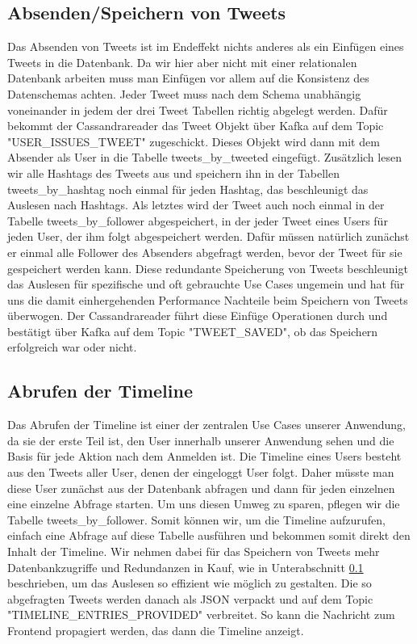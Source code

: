 \subsection{Absenden/Speichern von Tweets}
\label{subsec:Tweetabfrage}
Das Absenden von Tweets ist im Endeffekt nichts anderes als ein Einfügen eines Tweets in die Datenbank. Da wir hier aber nicht mit einer relationalen Datenbank arbeiten muss man Einfügen vor allem auf die Konsistenz des Datenschemas achten. Jeder Tweet muss nach dem Schema unabhängig voneinander in jedem der drei Tweet Tabellen richtig abgelegt werden. Dafür bekommt der Cassandrareader das Tweet Objekt über Kafka auf dem Topic "USER\_ISSUES\_TWEET" zugeschickt. Dieses Objekt wird dann mit dem Absender als User in die Tabelle tweets\_by\_tweeted eingefügt. Zusätzlich lesen wir alle Hashtags des Tweets aus und speichern ihn in der Tabellen tweets\_by\_hashtag noch einmal für jeden Hashtag, das beschleunigt das Auslesen nach Hashtags. Als letztes wird der Tweet auch noch einmal in der Tabelle tweets\_by\_follower abgespeichert, in der jeder Tweet eines Users für jeden User, der ihm folgt abgespeichert werden. Dafür müssen natürlich zunächst er einmal alle Follower des Absenders abgefragt werden, bevor der Tweet für sie gespeichert werden kann. Diese redundante Speicherung von Tweets beschleunigt das Auslesen für spezifische und oft gebrauchte Use Cases ungemein und hat für uns die damit einhergehenden Performance Nachteile beim Speichern von Tweets überwogen. Der Cassandrareader führt diese Einfüge Operationen durch und bestätigt über Kafka auf dem Topic "TWEET\_SAVED", ob das Speichern erfolgreich war oder nicht.


\subsection{Abrufen der Timeline}
\label{subsec:Timeline}
Das Abrufen der Timeline ist einer der zentralen Use Cases unserer Anwendung, da sie der erste Teil ist, den User innerhalb unserer Anwendung sehen und die Basis für jede Aktion nach dem Anmelden ist. Die Timeline eines Users besteht aus den Tweets aller User, denen der eingeloggt User folgt. Daher müsste man diese User zunächst aus der Datenbank abfragen und dann für jeden einzelnen eine einzelne Abfrage starten. Um uns diesen Umweg zu sparen, pflegen wir die Tabelle tweets\_by\_follower. Somit können wir, um die Timeline aufzurufen, einfach eine Abfrage auf diese Tabelle ausführen und bekommen somit direkt den Inhalt der Timeline. Wir nehmen dabei für das Speichern von Tweets mehr Datenbankzugriffe und Redundanzen in Kauf, wie in Unterabschnitt \ref{subsec:Tweetabfrage} beschrieben, um das Auslesen so effizient wie möglich zu gestalten. Die so abgefragten Tweets werden danach als JSON verpackt und auf dem Topic "TIMELINE\_ENTRIES\_PROVIDED" verbreitet. So kann die Nachricht zum Frontend propagiert werden, das dann die Timeline anzeigt.


